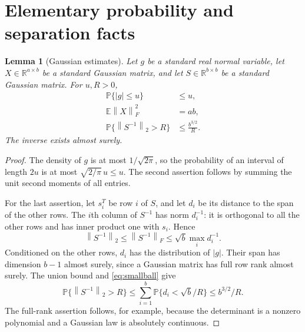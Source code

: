 \documentclass[11pt]{article}
\newtheorem{lemma}[theorem]{Lemma}
\theoremstyle{definition}
\newcommand{\R}{\mathbb R}
\newcommand{\Prob}{\mathbb P}
\newcommand{\E}{\mathbb E}
\newcommand{\norm}[1]{\left\lVert #1\right\rVert}
\begin{document}
\section{Elementary probability and separation facts}
\label{sec:lemmas}

\begin{lemma}[Gaussian estimates]
\label{lem:gaussian}
Let $g$ be a standard real normal variable, let $X\in\R^{a\times b}$ be a
standard Gaussian matrix, and let $S\in\R^{b\times b}$ be a standard
Gaussian matrix. For $u,R>0$,
\begin{align}
 \Prob\{|g|\leq u\}&\leq u,\label{eq:smallball}\\
 \E\norm{X}_F^2&=ab,\label{eq:gauss-moment}\\
 \Prob\{\norm{S^{-1}}_2>R\}&\leq\frac{b^{3/2}}{R}.
 \label{eq:gauss-inverse}
\end{align}
The inverse exists almost surely.
\end{lemma}
\begin{proof}
The density of $g$ is at most $1/\sqrt{2\pi}$, so the probability of an
interval of length $2u$ is at most $\sqrt{2/\pi}\,u\leq u$.
The second assertion follows by summing the unit second moments of all entries.

For the last assertion, let $s_i^T$ be row $i$ of $S$, and let
$d_i$ be its distance to the span of the other rows. The $i$th column of
$S^{-1}$ has norm $d_i^{-1}$: it is orthogonal to all the other rows and has
inner product one with $s_i$. Hence
\[
 \norm{S^{-1}}_2\leq\norm{S^{-1}}_F
 \leq\sqrt b\max_i d_i^{-1}.
\]
Conditioned on the other rows, $d_i$ has the distribution of $|g|$.
Their span has dimension $b-1$ almost surely, since a Gaussian matrix has
full row rank almost surely. The union bound and \eqref{eq:smallball} give
\[
 \Prob\{\norm{S^{-1}}_2>R\}
 \leq\sum_{i=1}^b\Prob\{d_i<\sqrt b/R\}
 \leq b^{3/2}/R.
\]
The full-rank assertion follows, for example, because the determinant is a
nonzero polynomial and a Gaussian law is absolutely continuous.
\end{proof}
\end{document}

